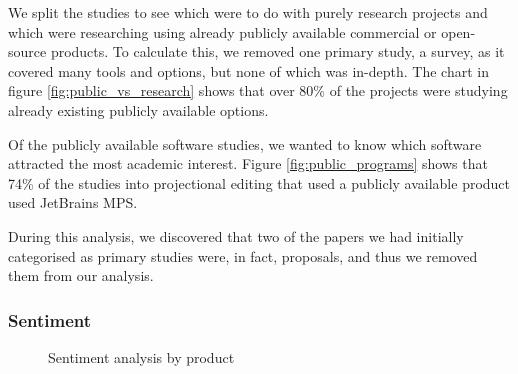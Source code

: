 We split the studies to see which were to do with purely research projects and which were researching using already publicly available commercial or open-source products.
To calculate this, we removed one primary study, a survey, as it covered many tools and options, but none of which was in-depth.
The chart in figure \ref{fig:public_vs_research} shows that over 80\% of the projects were studying already existing publicly available options.

Of the publicly available software studies, we wanted to know which software attracted the most academic interest.
Figure \ref{fig:public_programs} shows that 74\% of the studies into projectional editing that used a publicly available product used JetBrains MPS.

During this analysis, we discovered that two of the papers we had initially categorised as primary studies were, in fact, proposals, and thus we removed them from our analysis.

\subsubsection{Sentiment}

\begin{figure}
    \centering
    \caption{Sentiment analysis by product}
    \label{fig:sentiment_analysis2}
\end{figure}

